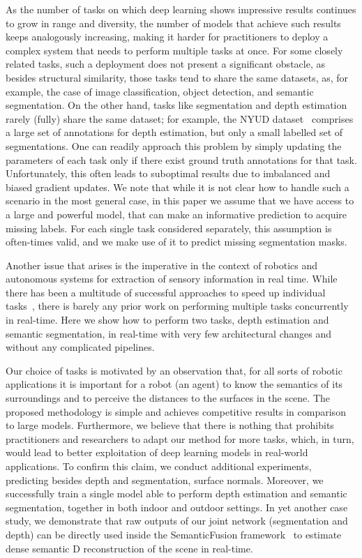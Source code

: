 \documentclass[letterpaper, 10 pt, conference]{ieeeconf}
\begin{document}
As the number of tasks on which deep learning shows impressive results continues to grow in range and diversity, the number of models that achieve such results keeps analogously increasing, making it harder for practitioners to deploy a complex system that needs to perform multiple tasks at once. For some closely related tasks, such a deployment does not present a significant obstacle, as besides structural similarity, those tasks tend to share the same datasets, as, for example, the case of image classification, object detection, and semantic segmentation. On the other hand, tasks like segmentation and depth estimation rarely (fully) share the same dataset;
for example, the NYUD dataset~\cite{SilbermanHKF12,GuptaAM13} comprises a large set of annotations for depth estimation, but only a small labelled set of segmentations. One can readily approach this problem by simply updating the parameters of each task only if there exist ground truth annotations for that task. Unfortunately, this often leads to suboptimal results due to imbalanced and biased gradient updates. We note that while it is not clear how to handle such a scenario in the most general case, in this paper we assume that we have access to a large and powerful model, that can make an informative prediction to acquire missing labels. For each single task considered separately, this assumption is often-times valid, and we make use of it to predict missing segmentation masks.

Another issue that arises is the imperative in the context of robotics and autonomous systems for extraction of sensory information in real time.
While there has been a multitude of successful approaches to speed up individual tasks~\cite{RenHG015,IandolaMAHDK16,ZhaoQSSJ17}, there is barely any prior work on performing multiple tasks concurrently in real-time. Here we show how to perform two tasks, depth estimation and semantic segmentation, in real-time with very few architectural changes and without any complicated pipelines.

Our choice of tasks is motivated by an observation that, for all sorts of robotic applications it is important for a robot (an agent) to know the semantics of its surroundings and to perceive the distances to the surfaces in the scene. The proposed methodology is simple and achieves competitive results in comparison to large models. Furthermore, we believe that there is nothing that prohibits practitioners and researchers to adapt our method for more tasks, which, in turn, would lead to better exploitation of deep learning models in real-world applications. To confirm this claim, we conduct additional experiments, predicting besides depth and segmentation, surface normals. Moreover, we successfully train a single model able to perform depth estimation and semantic segmentation, together in both indoor and outdoor settings. In yet another case study, we demonstrate that raw outputs of our joint network (segmentation and depth) can be directly used inside the SemanticFusion framework~\cite{McCormacHDL17} to estimate dense semantic D reconstruction of the scene in real-time.
\end{document}
